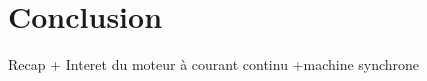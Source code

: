 \documentclass[french, a4paper, 10pt, twocolumn, landscape]{article}
\begin{document}









\section*{Conclusion}

Recap + Interet du moteur à courant continu +machine synchrone
\end{document}
